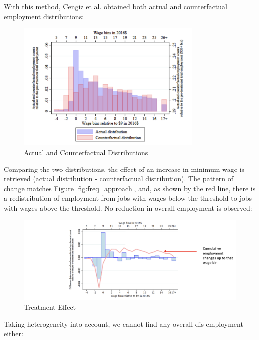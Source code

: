         With this method, Cengiz et al. obtained both actual and counterfactual employment distributions:
        \begin{figure}[H]
            \centering
            \includegraphics[width=3.5in]{images/ch2/Freq_approach_3.png}
            \caption{Actual and Counterfactual Distributions}
        \end{figure}
        Comparing the two distributions, the effect of an increase in minimum wage is retrieved (actual distribution - counterfactual distribution). The pattern of change matches Figure \ref{fig:freq_approach}, and, as shown by the red line, there is a redistribution of employment from jobs with wages below the threshold to jobs with wages above the threshold. No reduction in overall employment is observed:
        \begin{figure}[H]
            \centering
            \includegraphics[width=6.5in]{images/ch2/Freq_approach_4.png}
            \caption{Treatment Effect}
        \end{figure}
        Taking heterogeneity into account, we cannot find any overall dis-employment either:
